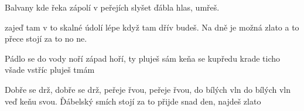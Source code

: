 
\beginverse{}
Balvany kde řeka zápolí
v peřejích slyšet ďábla hlas, umřeš.
\endverse{}

\beginverse{}
zajeď tam v to skalné údolí
lépe když tam dřív budeš.
Na dně je možná zlato
a to přece stojí za to no ne.
\endverse{}

\beginverse{}
Pádlo se do vody noří
západ hoří, ty pluješ sám
keňa se kupředu krade
ticho všade vstříc pluješ tmám
\endverse{}

\beginchorus{}
Dobře se drž, dobře se drž,
peřeje řvou, peřeje řvou,
do bílých vln do bílých vln
veď keňu svou.
Ďábelský smích stojí za to
přijde snad den, najdeš zlato
\endchorus{}

\endsong{}
